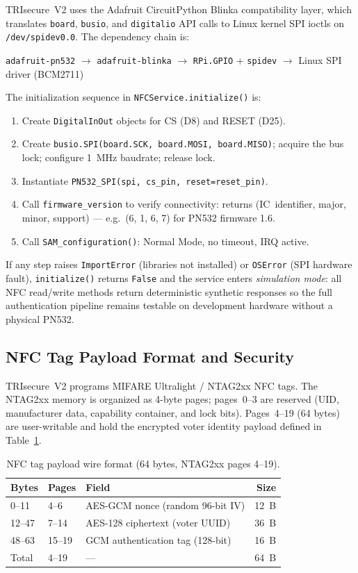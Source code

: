 \documentclass[conference]{IEEEtran}
\begin{document}
TRIsecure~V2 uses the Adafruit CircuitPython Blinka compatibility layer,
which translates \texttt{board}, \texttt{busio}, and \texttt{digitalio}
API calls to Linux kernel SPI ioctls on \texttt{/dev/spidev0.0}.
The dependency chain is:

\medskip
\noindent
\texttt{adafruit-pn532} $\to$ \texttt{adafruit-blinka} $\to$
\texttt{RPi.GPIO} + \texttt{spidev} $\to$ Linux SPI driver (BCM2711)
\medskip

\noindent The initialization sequence in \texttt{NFCService.initialize()} is:
\begin{enumerate}[label=\arabic*.,leftmargin=*,nosep]
  \item Create \texttt{DigitalInOut} objects for CS (D8) and RESET (D25).
  \item Create \texttt{busio.SPI(board.SCK, board.MOSI, board.MISO)};
        acquire the bus lock; configure 1~MHz baudrate; release lock.
  \item Instantiate \texttt{PN532\_SPI(spi, cs\_pin, reset=reset\_pin)}.
  \item Call \texttt{firmware\_version} to verify connectivity: returns
        (IC~identifier, major, minor, support) — e.g.\ (6, 1, 6, 7)
        for PN532 firmware 1.6.
  \item Call \texttt{SAM\_configuration()}: Normal Mode, no timeout,
        IRQ active.
\end{enumerate}

If any step raises \texttt{ImportError} (libraries not installed) or
\texttt{OSError} (SPI hardware fault), \texttt{initialize()} returns
\texttt{False} and the service enters \emph{simulation mode}: all NFC
read/write methods return deterministic synthetic responses so the full
authentication pipeline remains testable on development hardware without
a physical PN532.

\subsection{NFC Tag Payload Format and Security}

TRIsecure~V2 programs MIFARE Ultralight / NTAG2xx NFC tags.
The NTAG2xx memory is organized as 4-byte pages; pages~0–3 are reserved
(UID, manufacturer data, capability container, and lock bits).
Pages~4–19 (64 bytes) are user-writable and hold the encrypted voter
identity payload defined in Table~\ref{tab:nfc_payload}.

\begin{table}[t]
\centering
\caption{NFC tag payload wire format (64 bytes, NTAG2xx pages 4–19).}
\label{tab:nfc_payload}
\begin{tabular}{lllr}
  \toprule
  Bytes & Pages & Field & Size \\
  \midrule
  0–11   & 4–6    & AES-GCM nonce (random 96-bit IV) & 12~B \\
  12–47  & 7–14   & AES-128 ciphertext (voter UUID) & 36~B \\
  48–63  & 15–19  & GCM authentication tag (128-bit) & 16~B \\
  \midrule
  Total  & 4–19   & — & 64~B \\
  \bottomrule
\end{tabular}
\end{table}
\end{document}
